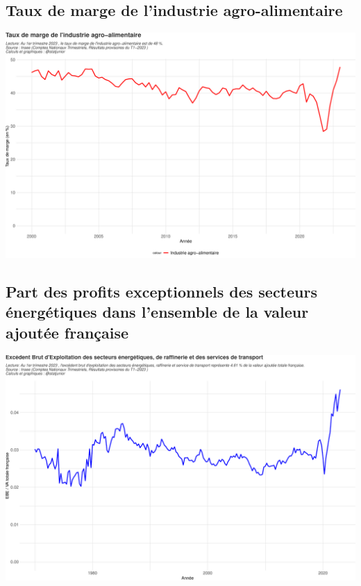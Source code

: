 \documentclass[
  paper=a4,
  ,captions=tableheading
]{scrartcl}
\begin{document}
\hypertarget{taux-de-marge-de-lindustrie-agro-alimentaire}{%
\subsection{Taux de marge de l'industrie
agro-alimentaire}\label{taux-de-marge-de-lindustrie-agro-alimentaire}}

\includegraphics{rapport_pdf_compte_branche_files/figure-latex/unnamed-chunk-28-1.pdf}

\hypertarget{part-des-profits-exceptionnels-des-secteurs-uxe9nerguxe9tiques-dans-lensemble-de-la-valeur-ajoutuxe9e-franuxe7aise}{%
\subsection{Part des profits exceptionnels des secteurs énergétiques
dans l'ensemble de la valeur ajoutée
française}\label{part-des-profits-exceptionnels-des-secteurs-uxe9nerguxe9tiques-dans-lensemble-de-la-valeur-ajoutuxe9e-franuxe7aise}}

\includegraphics{rapport_pdf_compte_branche_files/figure-latex/unnamed-chunk-29-1.pdf}
\end{document}
